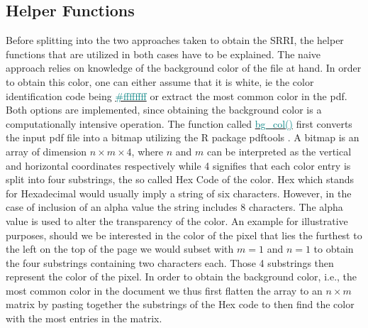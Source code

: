 \documentclass[aodsor,preprint]{imsart}
\numberwithin{equation}{section}
\theoremstyle{plain}
\begin{document}
\subsection{Helper Functions}
Before splitting into the two approaches taken to obtain the SRRI, the helper functions that are utilized in both cases have to be explained. The naive approach relies on knowledge of the background color of the file at hand. In order to obtain this color, one can either assume that it is white, ie the color identification code being \href{https://www.color-hex.com/color/ffffff}{\textcolor{teal}{\#ffffffff}} or extract the most common color in the pdf. Both options are implemented, since obtaining the background color is a computationally intensive operation. The function called  \href{https://github.com/Base-R-Best-R/KID/blob/main/Code/Package/KIDs/R/background_col_id.R}{\textcolor{teal}{bg\_col()}} first converts the input pdf file into a bitmap utilizing the R package pdftools \citep{pdftools}. A bitmap is an array of dimension $n \times m \times 4$, where $n$ and $m$ can be interpreted as the vertical and horizontal coordinates respectively while 4 signifies that each color entry is split into four substrings, the so called Hex Code of the color. Hex which stands for Hexadecimal would usually imply a string of six characters. However, in the case of inclusion of an alpha value the string includes 8 characters. The alpha value is used to alter the transparency of the color. An example for illustrative purposes, should we be interested in the color of the pixel that lies the furthest to the left on the top of the page we would subset with $m = 1$ and $n = 1$ to obtain the four substrings containing two characters each. Those 4 substrings then represent the color of the pixel. In order to obtain the background color, i.e., the most common color in the document we thus first flatten the array to an $n\times m$ matrix by pasting together the substrings of the Hex code to then find the color with the most entries in the matrix.\\
\end{document}
